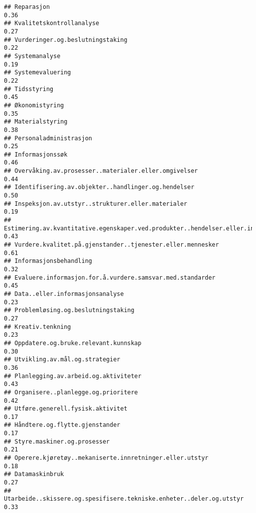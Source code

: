 \documentclass[
]{article}
\begin{document}
\begin{verbatim}
## Reparasjon                                                                       0.36
## Kvalitetskontrollanalyse                                                         0.27
## Vurderinger.og.beslutningstaking                                                 0.22
## Systemanalyse                                                                    0.19
## Systemevaluering                                                                 0.22
## Tidsstyring                                                                      0.45
## Økonomistyring                                                                   0.35
## Materialstyring                                                                  0.38
## Personaladministrasjon                                                           0.25
## Informasjonssøk                                                                  0.46
## Overvåking.av.prosesser..materialer.eller.omgivelser                             0.44
## Identifisering.av.objekter..handlinger.og.hendelser                              0.50
## Inspeksjon.av.utstyr..strukturer.eller.materialer                                0.19
## Estimering.av.kvantitative.egenskaper.ved.produkter..hendelser.eller.informasjon 0.43
## Vurdere.kvalitet.på.gjenstander..tjenester.eller.mennesker                       0.61
## Informasjonsbehandling                                                           0.32
## Evaluere.informasjon.for.å.vurdere.samsvar.med.standarder                        0.45
## Data..eller.informasjonsanalyse                                                  0.23
## Problemløsing.og.beslutningstaking                                               0.27
## Kreativ.tenkning                                                                 0.23
## Oppdatere.og.bruke.relevant.kunnskap                                             0.30
## Utvikling.av.mål.og.strategier                                                   0.36
## Planlegging.av.arbeid.og.aktiviteter                                             0.43
## Organisere..planlegge.og.prioritere                                              0.42
## Utføre.generell.fysisk.aktivitet                                                 0.17
## Håndtere.og.flytte.gjenstander                                                   0.17
## Styre.maskiner.og.prosesser                                                      0.21
## Operere.kjøretøy..mekaniserte.innretninger.eller.utstyr                          0.18
## Datamaskinbruk                                                                   0.27
## Utarbeide..skissere.og.spesifisere.tekniske.enheter..deler.og.utstyr             0.33

\end{verbatim}
\end{document}
